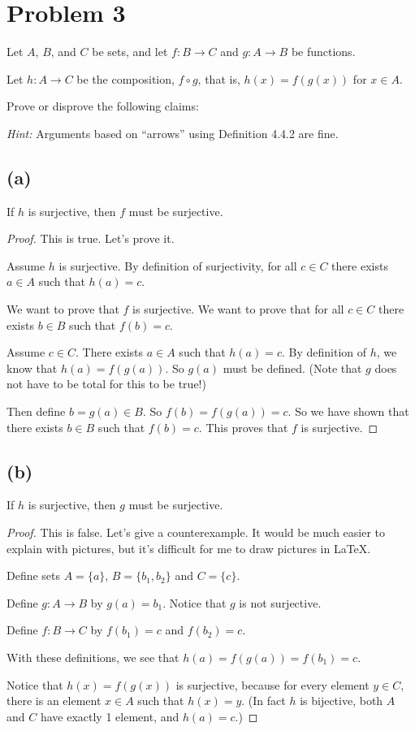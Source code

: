 \documentclass[14pt]{extarticle}
\begin{document}
\section{Problem 3}
Let $A$, $B$, and $C$ be sets, and let $f: B \rightarrow C$ and $g: A \rightarrow B$ be functions. 

Let $h: A \rightarrow C$ be the composition, $f \circ g$, that is, $h(x) = f(g(x))$ for $x \in A$. 

Prove or disprove the following claims:

\textit{Hint:} Arguments based on “arrows” using Definition 4.4.2 are fine.

\subsection{(a)}
If $h$ is surjective, then $f$ must be surjective.
\begin{proof}
This is true. Let's prove it.

Assume $h$ is surjective. By definition of surjectivity, for all $c \in C$ there exists $a \in A$ such that $h(a) = c$.

We want to prove that $f$ is surjective. We want to prove that for all $c \in C$ there exists $b \in B$ such that $f(b) = c$.

Assume $c \in C$. There exists $a \in A$ such that $h(a) = c$. By definition of $h$, we know that $h(a) = f(g(a))$. So $g(a)$ must be defined. (Note that $g$ does not have to be total for this to be true!)

Then define $b = g(a) \in B$. So $f(b) = f(g(a)) = c$. So we have shown that there exists $b \in B$ such that $f(b) = c$. This proves that $f$ is surjective.
\end{proof}

\subsection{(b)}
If $h$ is surjective, then $g$ must be surjective.
\begin{proof}
This is false. Let's give a counterexample. It would be much easier to explain with pictures, but it's difficult for me to draw pictures in \LaTeX.

Define sets $A = \{a\}$, $B = \{b_1, b_2\}$ and $C = \{c\}$.

Define $g: A \rightarrow B$ by $g(a) = b_1$. Notice that $g$ is not surjective.

Define $f : B \rightarrow C$ by $f(b_1) = c$ and $f(b_2) = c$.

With these definitions, we see that $h(a) = f(g(a)) = f(b_1) = c$.

Notice that $h(x) = f(g(x))$ is surjective, because for every element $y \in C$, there is an element $x \in A$ such that $h(x) = y$. (In fact $h$ is bijective, both $A$ and $C$ have exactly 1 element, and $h(a) = c$.)
\end{proof}
\end{document}
